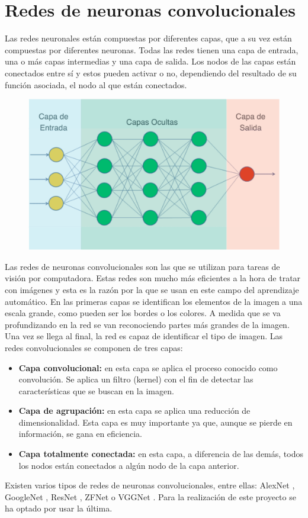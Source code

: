 \documentclass[12pt]{report} %
\begin{document}
	\section{Redes de neuronas convolucionales}
	Las redes neuronales están compuestas por diferentes capas, que a su vez están compuestas por diferentes neuronas. Todas las redes
	tienen una capa de entrada, una o más capas intermedias y una capa de salida. Los nodos de las capas están conectados entre sí
	y estos pueden activar o no, dependiendo del resultado de su función asociada, el nodo al que están conectados. 
	\begin{figure}[H]
		{\includegraphics[scale=0.4]{red-neuronal.png}}
	\end{figure}
	Las redes de neuronas convolucionales son las que se utilizan para tareas de visión por computadora. Estas redes son mucho más eficientes
	a la hora de tratar con imágenes y esta es la razón por la que se usan en este campo del aprendizaje automático. En las primeras capas
	se identifican los elementos de la imagen a una escala grande, como pueden ser los bordes o los colores. A medida que se va profundizando
	en la red se van reconociendo partes más grandes de la imagen. Una vez se llega al final, la red es capaz de identificar el tipo de imagen. 
	Las redes convolucionales se componen de tres capas:
	\begin{itemize}
		\item \textbf{Capa convolucional:} en esta capa se aplica el proceso conocido como convolución. Se aplica un filtro (kernel)
		con el fin de detectar las características que se buscan en la imagen. 
		\item \textbf{Capa de agrupación:} en esta capa se aplica una reducción de dimensionalidad. Esta capa es muy importante ya que, aunque se
		pierde en  información, se gana en eficiencia.
		\item \textbf{Capa totalmente conectada:} en esta capa, a diferencia de las demás, todos los nodos están conectados a algún nodo
		de la capa anterior. 
	\end{itemize}
	Existen varios tipos de redes de neuronas convolucionales, entre ellas: AlexNet \cite{alexNet}, GoogleNet \cite{googleNet}, 
	ResNet \cite{resNet}, ZFNet \cite{zfnet} o VGGNet \cite{vgg16-paper}.
	Para la realización de este proyecto se ha optado por usar la última.
\end{document}
